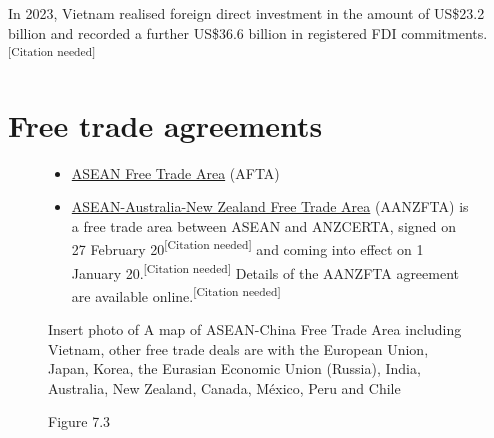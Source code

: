 \documentclass[openany]{book}
\begin{document}
In 2023, Vietnam realised foreign direct investment in the amount of US\$23.2 billion and recorded a further US\$36.6 billion in registered FDI commitme\-nts.\textsuperscript{[Citation needed]}

\clearpage
\section{Free trade agreements}

    \begin{figure}[ht!] 
        \begin{minipage}{0.49\textwidth}
            \centering
            \begin{itemize} 
                \item \href{https://en.wikipedia.org/wiki/ASEAN_Free_Trade_Area}{ASEAN Free Trade Area} (AF\-TA)
                \item \href{https://en.wikipedia.org/wiki/ASEAN%E2%80%93Australia%E2%80%93New_Zealand_Free_Trade_Area}{ASEAN-Aus\-tra\-li\-a-New Zea\-land Free Trade A\-rea} (A\-A\-N\-Z\-F\-T\-A) is a free trade a\-rea be\-tween A\-SEAN and A\-N\-Z\-C\-E\-R\-T\-A, sign\-ed on 27 Feb\-ruary 20\-09\textsuperscript{[Citation needed]} and com\-ing into ef\-fect on 1 Jan\-uary 20\-10.\textsuperscript{[Citation needed]} De\-tails of the A\-A\-N\-Z\-F\-T\-A agree\-ment are a\-vail\-able on\-line.\textsuperscript{[Citation needed]}
                \end{itemize}
        \end{minipage}
        \hfill 
        \begin{minipage}{0.45\textwidth}
            \begin{framed}    
            Insert photo of A map of A\-SEAN-China Free Trade Area including Vietnam, other free trade deals are with the European Union, Japan, Korea, the Eurasian Economic U\-nion (Russia), India, Australia, New Zealand, Canada, México, Peru and Chile
        \caption*{Figure 7.3}
        \end{framed}
        \end{minipage}
    \end{figure}
\end{document}
